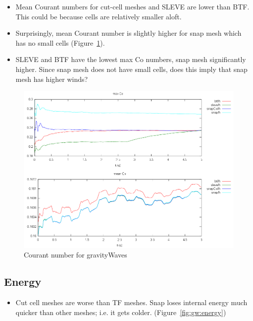 \begin{itemize}
	\item Mean Courant numbers for cut-cell meshes and SLEVE are lower than BTF.  This could be because cells are relatively smaller aloft.
	\item Surprisingly, mean Courant number is slightly higher for snap mesh which has no small cells (Figure~\ref{fig:gw:courant}).
	\item SLEVE and BTF have the lowest max Co numbers, snap mesh significantly higher.  Since snap mesh does not have small cells, does this imply that snap mesh has higher winds?
\end{itemize}

\begin{figure}
	\includegraphics[width=\textwidth]{interim-results/gravityWavesCourants.png}
	\caption{Courant number for gravityWaves}
	\label{fig:gw:courant}
\end{figure}

\subsection{Energy}
\begin{itemize}
	\item Cut cell meshes are worse than TF meshes.  Snap loses internal energy much quicker than other meshes; i.e. it gets colder. (Figure~\ref{fig:gw:energy})
\end{itemize}

